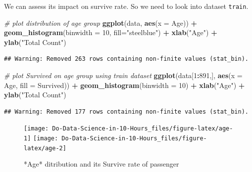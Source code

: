 \documentclass[
]{book}
\newenvironment{Shaded}{\begin{snugshade}}{\end{snugshade}}
\newcommand{\CommentTok}[1]{\textcolor[rgb]{0.56,0.35,0.01}{\textit{#1}}}
\newcommand{\DataTypeTok}[1]{\textcolor[rgb]{0.13,0.29,0.53}{#1}}
\newcommand{\DecValTok}[1]{\textcolor[rgb]{0.00,0.00,0.81}{#1}}
\newcommand{\KeywordTok}[1]{\textcolor[rgb]{0.13,0.29,0.53}{\textbf{#1}}}
\newcommand{\NormalTok}[1]{#1}
\newcommand{\OperatorTok}[1]{\textcolor[rgb]{0.81,0.36,0.00}{\textbf{#1}}}
\newcommand{\StringTok}[1]{\textcolor[rgb]{0.31,0.60,0.02}{#1}}
\begin{document}
We can assess its impact on survive rate. So we need to look into dataset \texttt{train}.

\begin{Shaded}
\begin{Highlighting}[]
\CommentTok{# plot distribution of age group}
\KeywordTok{ggplot}\NormalTok{(data, }\KeywordTok{aes}\NormalTok{(}\DataTypeTok{x =}\NormalTok{ Age)) }\OperatorTok{+}
\StringTok{  }\KeywordTok{geom_histogram}\NormalTok{(}\DataTypeTok{binwidth =} \DecValTok{10}\NormalTok{, }\DataTypeTok{fill=}\StringTok{"steelblue"}\NormalTok{) }\OperatorTok{+}
\StringTok{  }\KeywordTok{xlab}\NormalTok{(}\StringTok{"Age"}\NormalTok{) }\OperatorTok{+}
\StringTok{  }\KeywordTok{ylab}\NormalTok{(}\StringTok{"Total Count"}\NormalTok{)}
\end{Highlighting}
\end{Shaded}

\begin{verbatim}
## Warning: Removed 263 rows containing non-finite values (stat_bin).
\end{verbatim}

\begin{Shaded}
\begin{Highlighting}[]
\CommentTok{# plot Survived on age group using train dataset}
\KeywordTok{ggplot}\NormalTok{(data[}\DecValTok{1}\OperatorTok{:}\DecValTok{891}\NormalTok{,], }\KeywordTok{aes}\NormalTok{(}\DataTypeTok{x =}\NormalTok{ Age, }\DataTypeTok{fill =}\NormalTok{ Survived)) }\OperatorTok{+}
\StringTok{  }\KeywordTok{geom_histogram}\NormalTok{(}\DataTypeTok{binwidth =} \DecValTok{10}\NormalTok{) }\OperatorTok{+}
\StringTok{  }\KeywordTok{xlab}\NormalTok{(}\StringTok{"Age"}\NormalTok{) }\OperatorTok{+}
\StringTok{  }\KeywordTok{ylab}\NormalTok{(}\StringTok{"Total Count"}\NormalTok{)}
\end{Highlighting}
\end{Shaded}

\begin{verbatim}
## Warning: Removed 177 rows containing non-finite values (stat_bin).
\end{verbatim}

\begin{figure}

{\centering \texttt{[image: Do-Data-Science-in-10-Hours\_files/figure-latex/age-1]} \texttt{[image: Do-Data-Science-in-10-Hours\_files/figure-latex/age-2]} 

}

\caption{*Age* ditribution and its Survive rate of passenger}\label{fig:age}
\end{figure}
\end{document}

